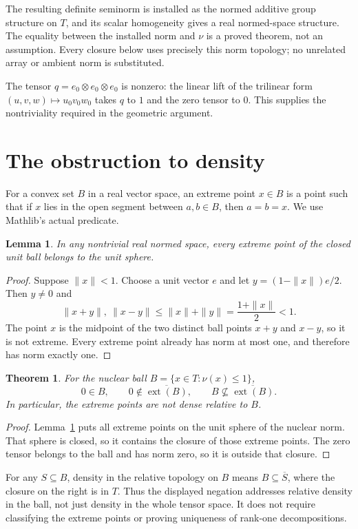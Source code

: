 \documentclass[11pt]{article}
\newtheorem{theorem}{Theorem}
\newtheorem{lemma}{Lemma}
\newcommand{\ext}{\operatorname{ext}}
\newcommand{\code}[1]{\texttt{\detokenize{#1}}}
\begin{document}
The resulting definite seminorm is installed as the normed additive group
structure on $T$, and its scalar homogeneity gives a real normed-space
structure. The equality between the installed norm and $\nu$ is a proved
theorem, not an assumption. Every closure below uses precisely this norm
topology; no unrelated array or ambient norm is substituted.

The tensor $q=e_0\otimes e_0\otimes e_0$ is nonzero: the linear lift of the
trilinear form $(u,v,w)\mapsto u_0v_0w_0$ takes $q$ to $1$ and the zero tensor to $0$.
This supplies the nontriviality required in the geometric argument.

\section{The obstruction to density}
For a convex set $B$ in a real vector space, an extreme point $x\in B$ is a
point such that if $x$ lies in the open segment between $a,b\in B$, then
$a=b=x$. We use Mathlib's actual \code{Set.extremePoints} predicate.

\begin{lemma}\label{lem:sphere}
In any nontrivial real normed space, every extreme point of the closed unit
ball belongs to the unit sphere.
\end{lemma}
\begin{proof}
Suppose $\|x\|<1$. Choose a unit vector $e$ and let
$y=(1-\|x\|)e/2$. Then $y\ne0$ and
\[
 \|x+y\|,\ \|x-y\|
 \le\|x\|+\|y\|=\frac{1+\|x\|}{2}<1.
\]
The point $x$ is the midpoint of the two distinct ball points $x+y$ and $x-y$,
so it is not extreme. Every extreme point already has norm at most one,
and therefore has norm exactly one.
\end{proof}

\begin{theorem}\label{thm:counterexample}
For the nuclear ball $B=\{x\in T:\nu(x)\le1\}$,
\[
 0\in B,\qquad 0\notin\overline{\ext(B)},\qquad
 B\not\subseteq\overline{\ext(B)}.
\]
In particular, the extreme points are not dense relative to $B$.
\end{theorem}
\begin{proof}
Lemma~\ref{lem:sphere} puts all extreme points on the unit sphere of the
nuclear norm. That sphere is closed, so it contains the closure of those
extreme points. The zero tensor belongs to the ball and has norm zero,
so it is outside that closure.
\end{proof}

For any $S\subseteq B$, density in the relative topology on $B$ means
$B\subseteq\overline S$, where the closure on the right is in $T$.
Thus the displayed negation addresses relative density in the ball, not just
density in the whole tensor space. It does not require classifying the
extreme points or proving uniqueness of rank-one decompositions.
\end{document}
